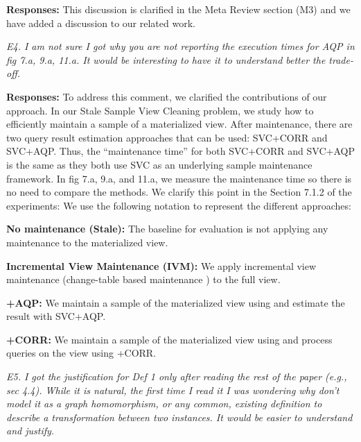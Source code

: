 \vspace{.25em}

{\bf Responses:} This discussion is clarified in the Meta Review section (M3) and we have added a discussion to our related work.

\vspace{1em}
\emph{E4. I am not sure I got why you are not reporting the execution times for AQP in fig 7.a, 9.a, 11.a. It would be interesting to have it to understand better the trade-off.}

\vspace{.25em}

{\bf Responses:} To address this comment, we clarified the contributions of our approach. In our Stale Sample View Cleaning problem, we study how to efficiently maintain a sample of a materialized view. After maintenance, there are two query result estimation approaches that can be used: SVC+CORR and SVC+AQP. Thus, the “maintenance time” for both SVC+CORR and SVC+AQP is the same as they both use SVC as an underlying sample maintenance framework.  In fig 7.a, 9.a, and 11.a, we measure the maintenance time so there is no need to compare the methods. We clarify this point in the Section 7.1.2 of the experiments:
We use the following notation to represent the different approaches:
\begin{displayquote}
\noindent\textbf{No maintenance (Stale): } The baseline for evaluation is not applying any maintenance to the materialized view.

\noindent\textbf{Incremental View Maintenance (IVM): } We apply incremental view maintenance (change-table based maintenance \cite{gupta2006incremental}) to the full view.

\noindent\textbf{\svcnospace+AQP: } We maintain a sample of the materialized view using \svc and estimate the result with SVC+AQP.

\noindent\textbf{\svcnospace+CORR: } We maintain a sample of the materialized view using \svc and process queries on the view using \svcnospace+CORR.
\end{displayquote}

\vspace{1em}
\emph{E5. I got the justification for Def 1 only after reading the rest of the paper (e.g., sec 4.4). While it is natural, the first time I read it I was wondering why don't model it as a graph homomorphism, or any common, existing definition to describe a transformation between two instances. It would be easier to understand and justify.}

